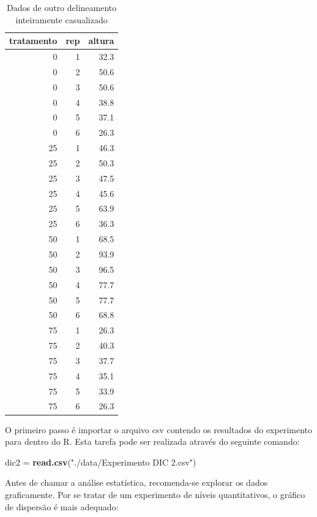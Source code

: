 \documentclass[
]{article}
\newenvironment{Shaded}{\begin{snugshade}}{\end{snugshade}}
\newcommand{\KeywordTok}[1]{\textcolor[rgb]{0.13,0.29,0.53}{\textbf{#1}}}
\newcommand{\NormalTok}[1]{#1}
\newcommand{\StringTok}[1]{\textcolor[rgb]{0.31,0.60,0.02}{#1}}
\begin{document}
\begin{table}

\caption{\label{tab:unnamed-chunk-54}Dados de outro delineamento inteiramente casualizado}
\centering
\begin{tabular}[t]{r|r|r}
\hline
tratamento & rep & altura\\
\hline
0 & 1 & 32.3\\
\hline
0 & 2 & 50.6\\
\hline
0 & 3 & 50.6\\
\hline
0 & 4 & 38.8\\
\hline
0 & 5 & 37.1\\
\hline
0 & 6 & 26.3\\
\hline
25 & 1 & 46.3\\
\hline
25 & 2 & 50.3\\
\hline
25 & 3 & 47.5\\
\hline
25 & 4 & 45.6\\
\hline
25 & 5 & 63.9\\
\hline
25 & 6 & 36.3\\
\hline
50 & 1 & 68.5\\
\hline
50 & 2 & 93.9\\
\hline
50 & 3 & 96.5\\
\hline
50 & 4 & 77.7\\
\hline
50 & 5 & 77.7\\
\hline
50 & 6 & 68.8\\
\hline
75 & 1 & 26.3\\
\hline
75 & 2 & 40.3\\
\hline
75 & 3 & 37.7\\
\hline
75 & 4 & 35.1\\
\hline
75 & 5 & 33.9\\
\hline
75 & 6 & 26.3\\
\hline
\end{tabular}
\end{table}

O primeiro passo é importar o arquivo csv contendo os resultados do experimento para dentro do R. Esta tarefa pode ser realizada através do seguinte comando:

\begin{Shaded}
\begin{Highlighting}[]
\NormalTok{dic2 =}\StringTok{ }\KeywordTok{read.csv}\NormalTok{(}\StringTok{"./data/Experimento DIC 2.csv"}\NormalTok{)}
\end{Highlighting}
\end{Shaded}

Antes de chamar a análise estatística, recomenda-se explorar os dados graficamente. Por se tratar de um experimento de níveis quantitativos, o gráfico de dispersão é mais adequado:
\end{document}
